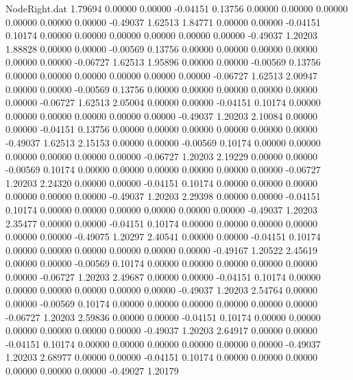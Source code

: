\begin{filecontents}{NodeRight.dat}
   1.79694    0.00000    0.00000    -0.04151    0.13756    0.00000    0.00000    0.00000    0.00000    0.00000    0.00000   -0.49037    1.62513
   1.84771    0.00000    0.00000    -0.04151    0.10174    0.00000    0.00000    0.00000    0.00000    0.00000    0.00000   -0.49037    1.20203
   1.88828    0.00000    0.00000    -0.00569    0.13756    0.00000    0.00000    0.00000    0.00000    0.00000    0.00000   -0.06727    1.62513
   1.95896    0.00000    0.00000    -0.00569    0.13756    0.00000    0.00000    0.00000    0.00000    0.00000    0.00000   -0.06727    1.62513
   2.00947    0.00000    0.00000    -0.00569    0.13756    0.00000    0.00000    0.00000    0.00000    0.00000    0.00000   -0.06727    1.62513
   2.05004    0.00000    0.00000    -0.04151    0.10174    0.00000    0.00000    0.00000    0.00000    0.00000    0.00000   -0.49037    1.20203
   2.10084    0.00000    0.00000    -0.04151    0.13756    0.00000    0.00000    0.00000    0.00000    0.00000    0.00000   -0.49037    1.62513
   2.15153    0.00000    0.00000    -0.00569    0.10174    0.00000    0.00000    0.00000    0.00000    0.00000    0.00000   -0.06727    1.20203
   2.19229    0.00000    0.00000    -0.00569    0.10174    0.00000    0.00000    0.00000    0.00000    0.00000    0.00000   -0.06727    1.20203
   2.24320    0.00000    0.00000    -0.04151    0.10174    0.00000    0.00000    0.00000    0.00000    0.00000    0.00000   -0.49037    1.20203
   2.29398    0.00000    0.00000    -0.04151    0.10174    0.00000    0.00000    0.00000    0.00000    0.00000    0.00000   -0.49037    1.20203
   2.35477    0.00000    0.00000    -0.04151    0.10174    0.00000    0.00000    0.00000    0.00000    0.00000    0.00000   -0.49075    1.20297
   2.40541    0.00000    0.00000    -0.04151    0.10174    0.00000    0.00000    0.00000    0.00000    0.00000    0.00000   -0.49167    1.20522
   2.45619    0.00000    0.00000    -0.00569    0.10174    0.00000    0.00000    0.00000    0.00000    0.00000    0.00000   -0.06727    1.20203
   2.49687    0.00000    0.00000    -0.04151    0.10174    0.00000    0.00000    0.00000    0.00000    0.00000    0.00000   -0.49037    1.20203
   2.54764    0.00000    0.00000    -0.00569    0.10174    0.00000    0.00000    0.00000    0.00000    0.00000    0.00000   -0.06727    1.20203
   2.59836    0.00000    0.00000    -0.04151    0.10174    0.00000    0.00000    0.00000    0.00000    0.00000    0.00000   -0.49037    1.20203
   2.64917    0.00000    0.00000    -0.04151    0.10174    0.00000    0.00000    0.00000    0.00000    0.00000    0.00000   -0.49037    1.20203
   2.68977    0.00000    0.00000    -0.04151    0.10174    0.00000    0.00000    0.00000    0.00000    0.00000    0.00000   -0.49027    1.20179

\end{filecontents}
